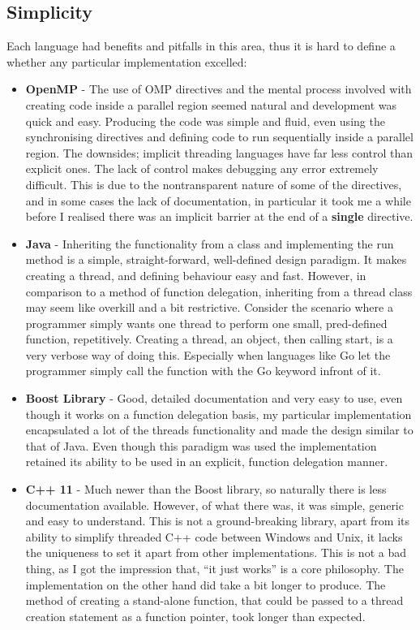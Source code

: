 \documentclass[11pt]{article} %
\begin{document}
\subsection{Simplicity}
Each language had benefits and pitfalls in this area, thus it is hard to define a whether any particular implementation excelled:
\begin{itemize}
\item {\bf OpenMP} - The use of OMP directives and the mental process involved with creating code inside a parallel region seemed natural and development was quick and easy. Producing the code was simple and fluid, even using the synchronising directives and defining code to run sequentially inside a parallel region. The downsides; implicit threading languages have far less control than explicit ones. The lack of control makes debugging any error extremely difficult. This is due to the nontransparent nature of some of the directives, and in some cases the lack of documentation, in particular it took me a while before I realised there was an implicit barrier at the end of a {\bf single} directive.
\item {\bf Java} - Inheriting the functionality from a class and implementing the run method is a simple, straight-forward, well-defined design paradigm. It makes creating a thread, and defining behaviour easy and fast. However, in comparison to a method of function delegation, inheriting from a thread class may seem like overkill and a bit restrictive. Consider the scenario where a programmer simply wants one thread to perform one small, pred-defined function, repetitively. Creating a thread, an object, then calling start, is a very verbose way of doing this. Especially when languages like Go let the programmer simply call the function with the Go keyword infront of it.  
\item {\bf Boost Library}  - Good, detailed documentation and very easy to use, even though it works on a function delegation basis, my particular implementation encapsulated a lot of the threads functionality and made the design similar to that of Java. Even though this paradigm was used the implementation retained its ability to be used in an explicit, function delegation manner.
\item {\bf C++ 11} - Much newer than the Boost library, so naturally there is less documentation available. However, of what there was, it was simple, generic and easy to understand. This is not a ground-breaking library, apart from its ability to simplify threaded C++ code between Windows and Unix, it lacks the uniqueness to set it apart from other implementations. This is not a bad thing, as I got the impression that, ``it just works'' is a core philosophy. The implementation on the other hand did take a bit longer to produce. The method of creating a stand-alone function, that could be passed to a thread creation statement as a function pointer, took longer than expected.

\end{itemize}
\end{document}
